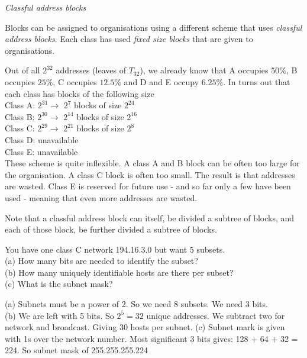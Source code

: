 \frmrule 

\textit{Classful address blocks}

Blocks can be assigned to organisations using a different scheme 
that uses \textit{classful address blocks}. Each class 
has used \textit{fixed size blocks} that are given to organisations.  

Out of all $2^{32}$ addresses (leaves of $T_{32}$), 
we already know that A occupies $50\%$, B occupies $25\%$, C occupies $12.5\%$ 
and D and E occupy $6.25\%$.  In turns out that each class has blocks of the following size \\
Class A: $2^{31} \rightarrow$ $2^{7}$ blocks of size $2^{24}$ \\
Class B: $2^{30} \rightarrow$  $2^{14}$ blocks of size $2^{16}$ \\
Class C: $2^{29} \rightarrow$  $2^{21}$ blocks of size $2^{8}$ \\
Class D: unavailable\\
Class E: unavailable\\

These scheme is quite inflexible.
A class A and B block can be often too large for the organisation. 
A class C block is often too small. The result is that 
addresses are wasted. Class E is reserved for future use - 
and so far only a few have been used - meaning that even more addresses 
are wasted. 


Note that a classful address block can itself, 
be divided a subtree of blocks, and each of those block, 
be further divided a subtree of blocks.

\frmrule 


\begin{example}
You have one class C network 194.16.3.0 but want 5 subsets. \\
(a) How many bits are needed to identify the subset?\\
(b) How many uniquely identifiable hosts are there per subset?\\
(c) What is the subnet mask?

(a) Subnets must be a power of 2. So we need 8 subsets. We need 3 bits.\\
(b) We are left with 5 bits. So $2^{5} = 32$ unique addresses. 
We subtract two for network and broadcast. Giving 30 hosts per subnet. 
(c) Subnet mark is given with 1s over the network number. 
Most significant 3 bits gives: 128 + 64 + 32 = 224. 
So subnet mask of 255.255.255.224
\end{example}



